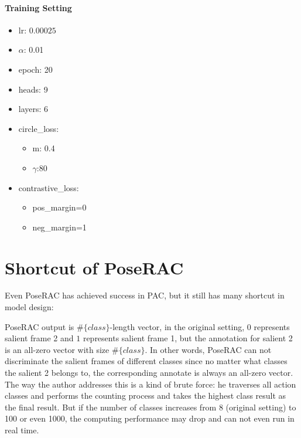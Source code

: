 \documentclass[10pt,twocolumn,letterpaper]{article}
\begin{document}
    \paragraph{Training Setting}
    \begin{itemize}
        \item lr: $0.00025$
        \item $\alpha$: 0.01
        \item epoch: 20
        \item heads: 9
        \item layers: 6
        \item circle\_loss:
        \begin{itemize}
            \item m: 0.4
            \item $\gamma$:80
        \end{itemize}
        \item contrastive\_loss:
        \begin{itemize}
            \item pos\_margin=0
            \item neg\_margin=1
        \end{itemize}
    \end{itemize}

    \section{Shortcut of PoseRAC}
    Even PoseRAC has achieved success in PAC, but it still has many shortcut in model design:
    
    PoseRAC output is $\#\{class\}$-length vector, in the original setting, $0$ represents salient frame 2 and $1$ represents salient frame 1, but the annotation for 
    salient 2 is an all-zero vector with size $\#\{class\}$. In other words, PoseRAC can not discriminate the salient frames of different classes since no matter what classes the salient 2 belongs to, the corresponding annotate is always an all-zero vector.
    The way the author addresses this is a kind of brute force: he traverses all action classes and performs the counting process and takes the highest class result as the final result.
    But if the number of classes increases from 8 (original setting) to 100 or even 1000, the computing performance may drop and can not even run in real time.
    {\small
    
    
    }
\end{document}
